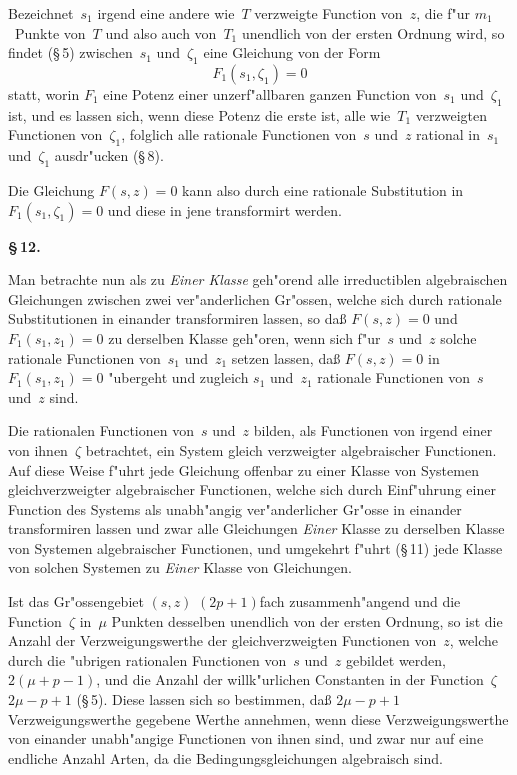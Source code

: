 \documentclass[12pt,a4paper]{book}
\theoremstyle{definition}
\theoremstyle{remark}
\begin{document}
Bezeichnet~$s_1$ irgend eine andere wie~$T$ verzweigte Function von~$z$,
die f"ur $m_1$~Punkte von~$T$ und also auch von~$T_1$ unendlich von der
ersten Ordnung wird, so findet (\S\,5) zwischen~$s_1$ und~$\zeta_1$ eine
Gleichung von der Form
\[
F_1(s_1, \zeta_1) = 0
\]
statt, worin $F_1$ eine Potenz einer unzerf"allbaren ganzen Function von~$s_1$
und~$\zeta_1$ ist, und es lassen sich, wenn diese Potenz die erste ist, alle
wie~$T_1$ verzweigten Functionen von~$\zeta_1$, folglich alle rationale Functionen
von~$s$ und~$z$ rational in~$s_1$ und~$\zeta_1$ ausdr"ucken (\S\,8).

Die Gleichung $F(s,z) = 0$ kann also durch eine rationale Substitution
in $F_1(s_1, \zeta_1) = 0$ und diese in jene transformirt werden.

\medskip
\textbf{\S\,12.}

Man betrachte nun als zu \emph{Einer Klasse} geh"orend alle irreductiblen
algebraischen Gleichungen zwischen zwei ver"anderlichen Gr"ossen, welche
sich durch rationale Substitutionen in einander transformiren lassen, so
da\ss{} $F(s,z) = 0$ und $F_1(s_1, z_1) = 0$ zu derselben Klasse geh"oren,
wenn sich f"ur~$s$ und~$z$ solche rationale Functionen von~$s_1$ und~$z_1$
setzen lassen, da\ss{} $F(s,z) = 0$ in $F_1(s_1, z_1) = 0$ "ubergeht und
zugleich $s_1$ und~$z_1$ rationale Functionen von~$s$ und~$z$ sind.

Die rationalen Functionen von~$s$ und~$z$ bilden, als Functionen von
irgend einer von ihnen~$\zeta$ betrachtet, ein System gleich verzweigter
algebraischer Functionen. Auf diese Weise f"uhrt jede Gleichung offenbar
zu einer Klasse von Systemen gleichverzweigter algebraischer Functionen,
welche sich durch Einf"uhrung einer Function des Systems als unabh"angig
ver"anderlicher Gr"osse in einander transformiren lassen und zwar alle
Gleichungen \emph{Einer} Klasse zu derselben Klasse von Systemen algebraischer
Functionen, und umgekehrt f"uhrt (\S\,11) jede Klasse von solchen Systemen
zu \emph{Einer} Klasse von Gleichungen.

Ist das Gr"ossengebiet $(s,z)$ $(2p+1)$fach zusammenh"angend und die
Function~$\zeta$ in~$\mu$ Punkten desselben unendlich von der ersten Ordnung,
so ist die Anzahl der Verzweigungswerthe der gleichverzweigten Functionen
von~$z$, welche durch die "ubrigen rationalen Functionen von~$s$ und~$z$
gebildet werden, $2(\mu + p - 1)$, und die Anzahl der willk"urlichen Constanten
in der Function~$\zeta$ $2\mu - p + 1$ (\S\,5). Diese lassen sich so bestimmen,
da\ss{} $2\mu - p + 1$ Verzweigungswerthe gegebene Werthe annehmen, wenn
diese Verzweigungswerthe von einander unabh"angige Functionen von ihnen
sind, und zwar nur auf eine endliche Anzahl Arten, da die Bedingungsgleichungen
algebraisch sind.
\end{document}
